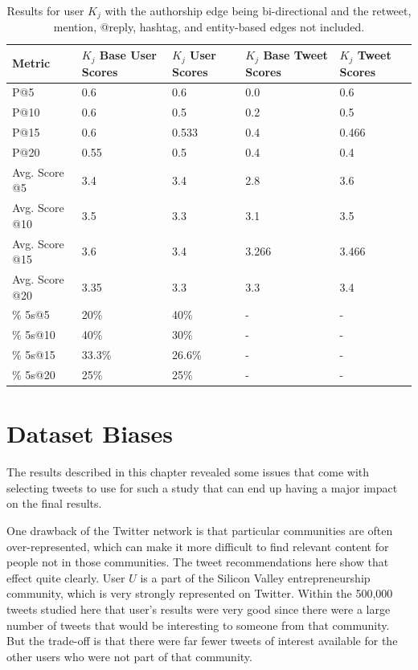 \begin{table}
\centering
\begin{tabular}{l|p{2.2cm}|p{2.2cm}|p{2.2cm}|p{2.2cm}}
{\bf Metric} & {\bf $K_{j}$ Base User Scores} & {\bf $K_{j}$ User Scores} & {\bf $K_{j}$ Base Tweet Scores} & {\bf $K_{j}$ Tweet Scores} \\ \hline
P@5   & 0.6 & 0.6 & 0.0 & 0.6 \\ \hline
P@10 & 0.6 & 0.5 & 0.2 & 0.5 \\ \hline
P@15 & 0.6 & 0.533 & 0.4 & 0.466 \\ \hline
P@20 & 0.55 & 0.5 & 0.4 & 0.4 \\ \hline

Avg. Score @5   & 3.4 & 3.4 & 2.8 & 3.6 \\ \hline
Avg. Score @10 & 3.5 & 3.3 & 3.1 & 3.5 \\ \hline
Avg. Score @15 & 3.6 & 3.4 & 3.266 & 3.466 \\ \hline
Avg. Score @20 & 3.35 & 3.3 & 3.3 & 3.4 \\ \hline

\% 5s@5    & 20\% & 40\% & - & - \\ \hline
\% 5s@10  & 40\% & 30\% & - & - \\ \hline
\% 5s@15  & 33.3\% & 26.6\% & - & - \\ \hline
\% 5s@20  & 25\% & 25\% & - & - \\

\end{tabular}
\caption[Results for user $K_{j}$ using combined configuration 2]{Results for user $K_{j}$ with the authorship edge being bi-directional and the retweet, mention, @reply, hashtag, and entity-based edges not included.}
\label{tab:BiAuthorNo369NoContent}
\end{table}



\section{Dataset Biases}

The results described in this chapter revealed some issues that come with selecting tweets to use for such a study that can end up having a major impact on the final results.

One drawback of the Twitter network is that particular communities are often over-represented, which can make it more difficult to find relevant content for people not in those communities. The tweet recommendations here show that effect quite clearly. User $U$ is a part of the Silicon Valley entrepreneurship community, which is very strongly represented on Twitter. Within the 500,000 tweets studied here that user's results were very good since there were a large number of tweets that would be interesting to someone from that community. But the trade-off is that there were far fewer tweets of interest available for the other users who were not part of that community.


